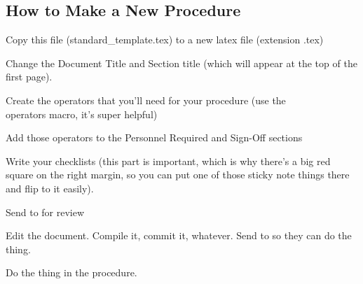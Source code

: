 \newpage
\subsection{How to Make a New Procedure}
\begin{checklist}
    \item \auth{} Copy this file (standard\_template.tex) to a new latex file (extension .tex)
    \item \auth{} Change the Document Title and Section title (which will appear at the top of the first page).
    \item \auth{} Create the operators that you'll need for your procedure (use the \\operators macro, it's super helpful)
    \item \auth{} Add those operators to the Personnel Required and Sign-Off sections
    \item \auth{} Write your checklists (this part is important, which is why there's a big red square on the right margin, so you can put one of those sticky note things there and flip to it easily). 
    \item \auth{} Send to \edi{} for review
    \item \edi{} Edit the document. Compile it, commit it, whatever. Send to \perf{} so they can do the thing.
    \item \perf{} Do the thing in the procedure.
\end{checklist}
\setcounter{checklistnum}{0}


